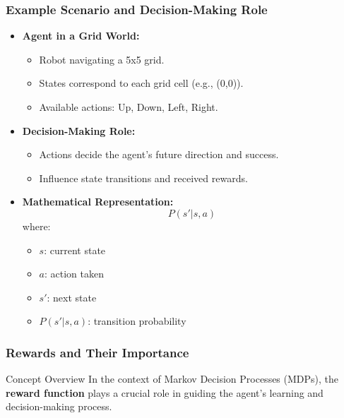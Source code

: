 \documentclass[aspectratio=169]{beamer}
\begin{document}
\begin{frame}[fragile]
    \frametitle{Example Scenario and Decision-Making Role}
    \begin{itemize}
        \item \textbf{Agent in a Grid World:}
        \begin{itemize}
            \item Robot navigating a 5x5 grid.
            \item States correspond to each grid cell (e.g., (0,0)).
            \item Available actions: {Up, Down, Left, Right}.
        \end{itemize}
        
        \item \textbf{Decision-Making Role:}
        \begin{itemize}
            \item Actions decide the agent's future direction and success.
            \item Influence state transitions and received rewards.
        \end{itemize}
        
        \item \textbf{Mathematical Representation:}
        \begin{equation}
            P(s'|s,a)
        \end{equation}
        where:
        \begin{itemize}
            \item \( s \): current state
            \item \( a \): action taken
            \item \( s' \): next state
            \item \( P(s'|s,a) \): transition probability
        \end{itemize}
    \end{itemize}
\end{frame}

\begin{frame}[fragile]
    \frametitle{Rewards and Their Importance}
    
    \begin{block}{Concept Overview}
        In the context of Markov Decision Processes (MDPs), the \textbf{reward function} plays a crucial role in guiding the agent's learning and decision-making process.
    \end{block} 
\end{frame}
\end{document}
